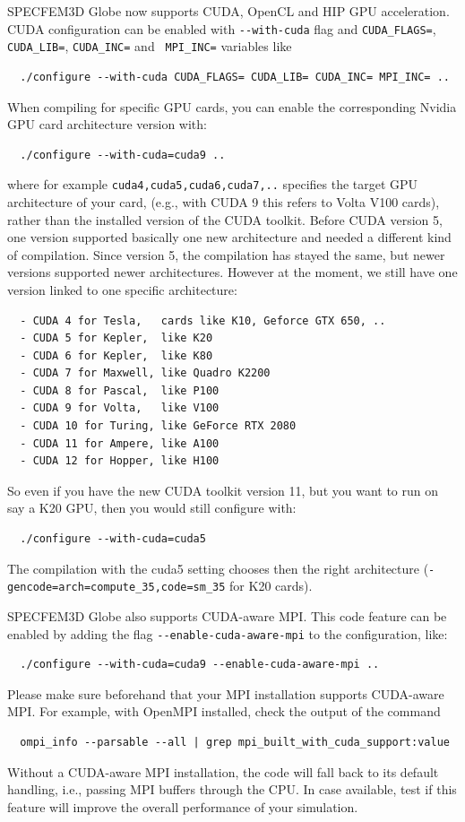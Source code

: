 \noindent
SPECFEM3D Globe now supports CUDA, OpenCL and HIP GPU acceleration.
CUDA configuration can be enabled with \texttt{-{}-with-cuda} flag and
\texttt{CUDA\_FLAGS=}, \texttt{CUDA\_LIB=}, \texttt{CUDA\_INC=}
and \texttt{ MPI\_INC=} variables like
{\small
\begin{verbatim}
  ./configure --with-cuda CUDA_FLAGS= CUDA_LIB= CUDA_INC= MPI_INC= ..
\end{verbatim}
}
\noindent
When compiling for specific GPU cards, you can enable the corresponding Nvidia GPU card architecture version with:
{\small
\begin{verbatim}
  ./configure --with-cuda=cuda9 ..
\end{verbatim}
}
\noindent
where for example \texttt{cuda4,cuda5,cuda6,cuda7,..} specifies the target GPU architecture of your card,
(e.g., with CUDA 9 this refers to Volta V100 cards), rather than the installed version of the CUDA toolkit.
Before CUDA version 5, one version supported basically one new architecture and needed a different kind of compilation.
Since version 5, the compilation has stayed the same, but newer versions supported newer architectures.
However at the moment, we still have one version linked to one specific architecture:
{\small
\begin{verbatim}
  - CUDA 4 for Tesla,   cards like K10, Geforce GTX 650, ..
  - CUDA 5 for Kepler,  like K20
  - CUDA 6 for Kepler,  like K80
  - CUDA 7 for Maxwell, like Quadro K2200
  - CUDA 8 for Pascal,  like P100
  - CUDA 9 for Volta,   like V100
  - CUDA 10 for Turing, like GeForce RTX 2080
  - CUDA 11 for Ampere, like A100
  - CUDA 12 for Hopper, like H100
\end{verbatim}
}
\noindent
So even if you have the new CUDA toolkit version 11, but you want to run on say a K20 GPU, then you would still configure with:
{\small
\begin{verbatim}
  ./configure --with-cuda=cuda5
\end{verbatim}
}
\noindent
The compilation with the cuda5 setting chooses then the right architecture (\texttt{-gencode=arch=compute\_35,code=sm\_35} for K20 cards).\newline


SPECFEM3D Globe also supports CUDA-aware MPI. This code feature can be enabled by adding the flag \texttt{-{}-enable-cuda-aware-mpi} to
the configuration, like:
{\small
\begin{verbatim}
  ./configure --with-cuda=cuda9 --enable-cuda-aware-mpi ..
\end{verbatim}
}
\noindent
Please make sure beforehand that your MPI installation supports CUDA-aware MPI.
For example, with OpenMPI installed, check the output of the command
{\small
\begin{verbatim}
  ompi_info --parsable --all | grep mpi_built_with_cuda_support:value
\end{verbatim}
}
\noindent
Without a CUDA-aware MPI installation, the code will fall back to its default handling, i.e., passing MPI buffers through the CPU.
In case available, test if this feature will improve the overall performance of your simulation.\newline


